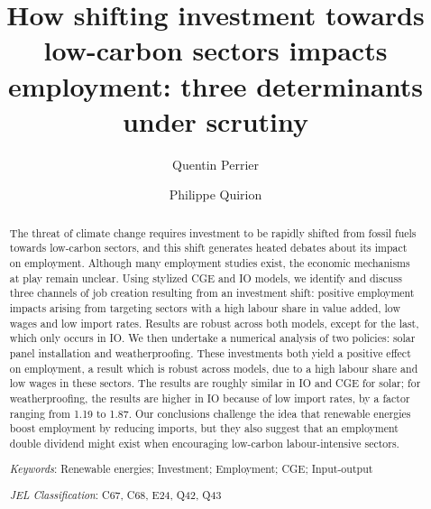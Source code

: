 \documentclass[1p]{elsarticle}
\begin{document}
\hypersetup{
		linkcolor=CiredGreen,
		urlcolor=CiredGreen,
		citecolor=CiredGreen
}

\begin{frontmatter}
	
	\title{How shifting investment towards low-carbon sectors impacts employment: three determinants under scrutiny}
	
	\author[perrier]{Quentin Perrier}
	\author[quirion]{Philippe Quirion}
	\address[perrier]{CIRED, 45 bis, avenue de la Belle Gabrielle, 94736 Nogent-sur-Marne Cedex, France}
	\address[quirion]{CIRED, CNRS, 45 bis, avenue de la Belle Gabrielle, 94736 Nogent-sur-Marne Cedex, France}
	
	\begin{abstract}
		The threat of climate change requires investment to be rapidly shifted from fossil fuels towards low-carbon sectors, and this shift generates heated debates about its impact on employment. 
		Although many employment studies exist, the economic mechanisms at play remain unclear. 
		Using stylized CGE and IO models, we identify and discuss three channels of job creation resulting from an investment shift: positive employment impacts arising from targeting sectors with a high labour share in value added, low wages and low import rates. Results are robust across both models, except for the last, which only occurs in IO. 
		We then undertake a numerical analysis of two policies: solar panel installation and weatherproofing. These investments both yield a positive effect on employment, a result which is robust across models, due to a high labour share and low wages in these sectors. The results are roughly similar in IO and CGE for solar; for weatherproofing, the results are higher in IO because of low import rates, by a factor ranging from 1.19 to 1.87.
		Our conclusions challenge the idea that renewable energies boost employment by reducing imports, but they also suggest that an employment double dividend might exist when encouraging low-carbon labour-intensive sectors.
		\newline
		 
		\textit{Keywords}: Renewable energies; Investment; Employment; CGE; Input-output
		\newline

		\textit{JEL Classification}: C67, C68, E24, Q42, Q43
		\strut
		
	\end{abstract}
	
\end{frontmatter}
\end{document}

